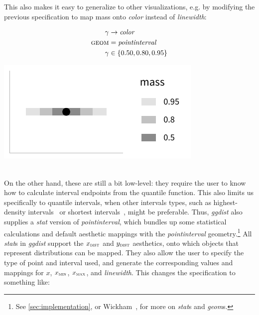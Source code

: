 \documentclass[journal]{vgtc}                     %
\newcommand{\equationfigure}[2]{%
\noindent
\begin{minipage}{.5\columnwidth}
\setlength{\abovedisplayskip}{0pt}
\setlength{\belowdisplayskip}{0pt}
#1\end{minipage}%
\begin{minipage}{.4\columnwidth}\centering #2 \end{minipage}%
\vspace{.5\belowdisplayskip}\\
}
\begin{document}
This also makes it easy to generalize to other visualizations, e.g. by modifying the previous specification to map mass onto \textit{color} instead of \textit{linewidth}:

\equationfigure{
\begin{align*}
\gamma &\rightarrow \mathit{color}\\
\textsc{geom} &= \mathit{pointinterval}\\
\gamma &\in \{0.50, 0.80, 0.95\}
\end{align*}
}{\includegraphics[width=1.2\columnwidth]{figs/3-stat_pointinterval_color.pdf}}
On the other hand, these are still a bit low-level: they require the user to know how to calculate interval endpoints from the quantile function. This also limits us specifically to quantile intervals, when other intervals types, such as highest-density intervals~\cite{hyndman1996computing} or shortest intervals~\cite{liu2015spi}, might be preferable. Thus, \textit{ggdist} also supplies a \textit{stat} version of \textit{pointinterval}, which bundles up some statistical calculations and default aesthetic mappings with the \textit{pointinterval} geometry.\footnote{See \cref{sec:implementation}, or Wickham~\cite{wickham2010layered}, for more on \textit{stat}s and \textit{geom}s.} All \textit{stat}s in \textit{ggdist} support the $x_\textsc{dist}$ and $y_\textsc{dist}$ aesthetics, onto which objects that represent distributions can be mapped. They also allow the user to specify the type of point and interval used, and generate the corresponding values and mappings for $x$, $x_\textsc{min}$, $x_\textsc{max}$, and \textit{linewidth}. This changes the specification to something like:
\end{document}

